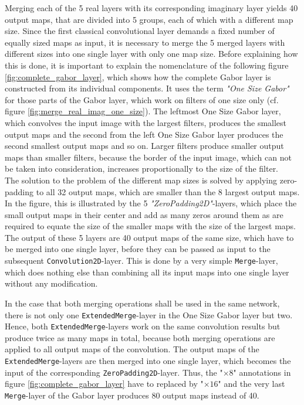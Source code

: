 \documentclass[11pt, a4paper]{article}
\newcommand\q[1]{\emph{"#1"}}
\begin{document}
\begin{appendix}
Merging each of the 5 real layers with its corresponding imaginary layer yields 40 output maps, that are divided into 5 groups, each of which with a different map size. Since the first classical convolutional layer demands a fixed number of equally sized maps as input, it is necessary to merge the 5 merged layers with different sizes into one single layer with only one map size. Before explaining how this is done, it is important to explain the nomenclature of the following figure \ref{fig:complete_gabor_layer}, which shows how the complete Gabor layer is constructed from its individual components. It uses the term \q{One Size Gabor} for those parts of the Gabor layer, which work on filters of one size only (cf. figure \ref{fig:merge_real_imag_one_size}). The leftmost One Size Gabor layer, which convolves the input image with the largest filters, produces the smallest output maps and the second from the left One Size Gabor layer produces the second smallest output maps and so on. Larger filters produce smaller output maps than smaller filters, because the border of the input image, which can not be taken into consideration, increases proportionally to the size of the filter.\\
The solution to the problem of the different map sizes is solved by applying zero-padding to all 32 output maps, which are smaller than the 8 largest output maps. In the figure, this is illustrated by the 5 \q{ZeroPadding2D}-layers, which place the small output maps in their center and add as many zeros around them as are required to equate the size of the smaller maps with the size of the largest maps. The output of these 5 layers are 40 output maps of the same size, which have to be merged into one single layer, before they can be passed as input to the subsequent \texttt{Convolution2D}-layer. This is done by a very simple \texttt{Merge}-layer, which does nothing else than combining all its input maps into one single layer without any modification.


In the case that both merging operations shall be used in the same network, there is not only one \texttt{ExtendedMerge}-layer in the One Size Gabor layer but two. Hence, both \texttt{ExtendedMerge}-layers work on the same convolution results but produce twice as many maps in total, because both merging operations are applied to all output maps of the convolution. The output maps of the \texttt{ExtendedMerge}-layers are then merged into one single layer, which becomes the input of the corresponding \texttt{ZeroPadding2D}-layer. Thus, the "$\times 8$" annotations in figure \ref{fig:complete_gabor_layer} have to replaced by "$\times 16$" and the very last \texttt{Merge}-layer of the Gabor layer produces 80 output maps instead of 40.\\
\end{appendix}
\end{document}
